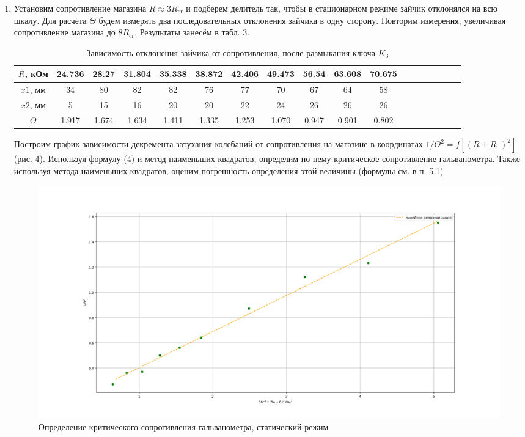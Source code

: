 \documentclass[a4paper]{article}
\begin{document}
\begin{enumerate}
    \item Установим сопротивление магазина $R \approx 3R_\text{cr}$ и подберем делитель так, чтобы в стационарном режиме зайчик отклонялся на всю шкалу. Для расчёта $\Theta$ будем измерять два последовательных отклонения зайчика в одну сторону. Повторим измерения, увеличивая сопротивление магазина до $8R_\text{cr}$. Результаты занесём в табл. 3.

          \begin{table}[H]
              \centering
              \begin{center}
                  \caption{Зависимость отклонения зайчика от сопротивления, после размыкания ключа $K_3$}
              \end{center}
              \vspace{0.1cm}
              \label{tab:my_label}
              \begin{tabular}{ |c|c|c|c|c|c|c|c|c|c|c|c|c|c|c|c|c|c|}
                  \hline
                  $R$, кОм & 24.736 & 28.27 & 31.804 & 35.338 & 38.872 & 42.406 & 49.473 & 56.54 & 63.608 & 70.675 \\
                  \hline
                  $x1$, мм & 34     & 80    & 82     & 82     & 76     & 77     & 70     & 67    & 64     & 58     \\
                  \hline
                  $x2$, мм & 5      & 15    & 16     & 20     & 20     & 22     & 24     & 26    & 26     & 26     \\
                  \hline
                  $\Theta$ & 1.917  & 1.674 & 1.634  & 1.411  & 1.335  & 1.253  & 1.070  & 0.947 & 0.901  & 0.802  \\
                  \hline
              \end{tabular}
          \end{table}

          Построим график зависимости декремента затухания колебаний от сопротивления на магазине в координатах $1/\Theta^2 = f[(R+R_0)^2]$ (рис. 4). Используя формулу (4) и метод наименьших квадратов, определим по нему критическое сопротивление гальванометра. Также используя метода наименьших квадратов, оценим погрешность определения этой величины (формулы см. в п. 5.1)

          \begin{figure}[H]
              \centering
              \includegraphics[width=\textwidth]{Figure_2.png}
              \caption{Определение критического сопротивления гальванометра, статический режим}
              \label{fig:vac}
          \end{figure}


\end{enumerate}
\end{document}
